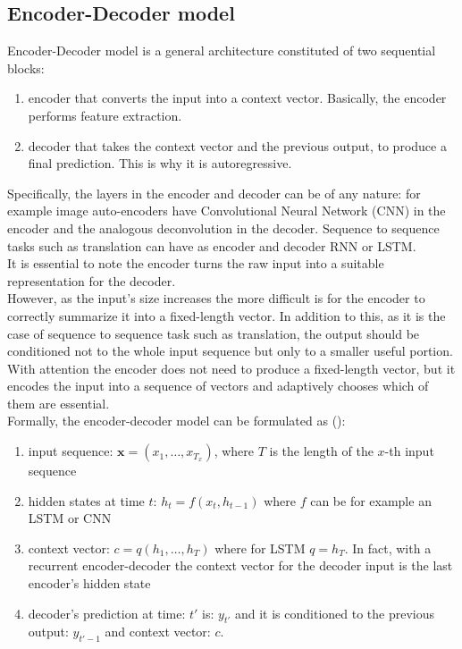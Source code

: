 \documentclass[LaM,binding=0.6cm]{sapthesis}
\begin{document}
\subsection{Encoder-Decoder model}
Encoder-Decoder model is a general architecture constituted of two sequential blocks:
\begin{enumerate}
\item encoder that converts the input into a context vector. Basically, the encoder performs feature extraction.
\item decoder that takes the context vector and the previous output, to produce a final prediction. This is why it is autoregressive.
\end{enumerate}
Specifically, the layers in the encoder and decoder can be of any nature: for example image auto-encoders have Convolutional Neural Network (CNN) in the encoder and the analogous deconvolution in the decoder. Sequence to sequence tasks such as translation can have as encoder and decoder RNN or LSTM.\\It is essential to note the encoder turns the raw input into a suitable representation for the decoder.\\However, as the input's size increases the more difficult is for the encoder to correctly summarize it into a fixed-length vector. In addition to this, as it is the case of sequence to sequence task such as translation, the output should be conditioned not to the whole input sequence but only to a smaller useful portion.\\With attention the encoder does not need to produce a fixed-length vector, but it encodes the input into a sequence of vectors and adaptively chooses which of them are essential.\\Formally, the encoder-decoder model can be formulated as (\cite{bah}):
\begin{enumerate}
\item input sequence: $\textbf{x}=(x_1,\dots,x_{T_{x}})$, where $T$ is the length of the $x$-th input sequence
\item hidden states at time $t$: $h_t=f(x_t,h_{t-1})$ where $f$ can be for example an LSTM or CNN
\item context vector: $c=q(h_1,\dots,h_{T})$ where for LSTM $q=h_{T}$. In fact, with a recurrent encoder-decoder the context vector for the decoder input is the last encoder's hidden state
\item decoder's prediction at time: $t'$ is: $y_{t'}$ and it is conditioned to the previous output: $y_{t'-1}$ and context vector: $c$.
\end{enumerate}
\end{document}
